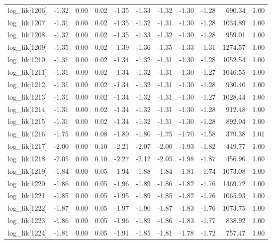 \begin{table}[ht]
\begin{tabular}{rrrrrrrrrrr}
  log\_lik[1206] & -1.32 & 0.00 & 0.02 & -1.35 & -1.33 & -1.32 & -1.30 & -1.28 & 690.34 & 1.00 \\ 
  log\_lik[1207] & -1.31 & 0.00 & 0.02 & -1.35 & -1.32 & -1.31 & -1.30 & -1.28 & 1034.89 & 1.00 \\ 
  log\_lik[1208] & -1.32 & 0.00 & 0.02 & -1.35 & -1.33 & -1.32 & -1.30 & -1.28 & 959.01 & 1.00 \\ 
  log\_lik[1209] & -1.35 & 0.00 & 0.02 & -1.39 & -1.36 & -1.35 & -1.33 & -1.31 & 1274.57 & 1.00 \\ 
  log\_lik[1210] & -1.31 & 0.00 & 0.02 & -1.34 & -1.32 & -1.31 & -1.30 & -1.28 & 1052.54 & 1.00 \\ 
  log\_lik[1211] & -1.31 & 0.00 & 0.02 & -1.34 & -1.32 & -1.31 & -1.30 & -1.27 & 1046.55 & 1.00 \\ 
  log\_lik[1212] & -1.31 & 0.00 & 0.02 & -1.34 & -1.32 & -1.31 & -1.30 & -1.28 & 930.40 & 1.00 \\ 
  log\_lik[1213] & -1.31 & 0.00 & 0.02 & -1.34 & -1.32 & -1.31 & -1.30 & -1.27 & 1028.44 & 1.00 \\ 
  log\_lik[1214] & -1.31 & 0.00 & 0.02 & -1.34 & -1.32 & -1.31 & -1.30 & -1.28 & 912.48 & 1.00 \\ 
  log\_lik[1215] & -1.31 & 0.00 & 0.02 & -1.34 & -1.32 & -1.31 & -1.30 & -1.28 & 892.04 & 1.00 \\ 
  log\_lik[1216] & -1.75 & 0.00 & 0.08 & -1.89 & -1.80 & -1.75 & -1.70 & -1.58 & 379.38 & 1.01 \\ 
  log\_lik[1217] & -2.00 & 0.00 & 0.10 & -2.21 & -2.07 & -2.00 & -1.93 & -1.82 & 449.77 & 1.00 \\ 
  log\_lik[1218] & -2.05 & 0.00 & 0.10 & -2.27 & -2.12 & -2.05 & -1.98 & -1.87 & 456.90 & 1.00 \\ 
  log\_lik[1219] & -1.84 & 0.00 & 0.05 & -1.94 & -1.88 & -1.84 & -1.81 & -1.74 & 1073.08 & 1.00 \\ 
  log\_lik[1220] & -1.86 & 0.00 & 0.05 & -1.96 & -1.89 & -1.86 & -1.82 & -1.76 & 1469.72 & 1.00 \\ 
  log\_lik[1221] & -1.85 & 0.00 & 0.05 & -1.95 & -1.89 & -1.85 & -1.82 & -1.76 & 1065.93 & 1.00 \\ 
  log\_lik[1222] & -1.87 & 0.00 & 0.05 & -1.97 & -1.90 & -1.87 & -1.83 & -1.76 & 1073.75 & 1.00 \\ 
  log\_lik[1223] & -1.86 & 0.00 & 0.05 & -1.96 & -1.89 & -1.86 & -1.83 & -1.77 & 838.92 & 1.00 \\ 
  log\_lik[1224] & -1.81 & 0.00 & 0.05 & -1.91 & -1.85 & -1.81 & -1.78 & -1.72 & 757.47 & 1.00 \\ 

\end{tabular}
\end{table}
